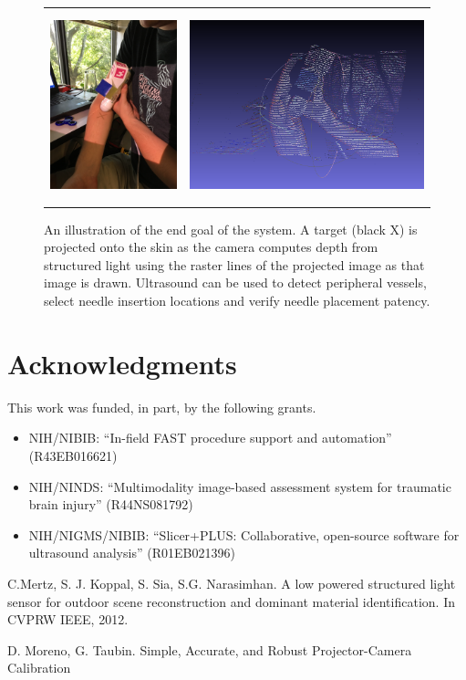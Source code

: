 \documentclass{llncs}
\begin{document}
\begin{figure}
\centering
\begin{tabular}{cc}
\centering
\includegraphics[height=5.5cm,keepaspectratio]{Hastings_arm} &
\includegraphics[height=5.5cm,keepaspectratio]{Hastings_arm_pointcloud}\\
\end{tabular}

\caption{An illustration of the end goal of the system. A target (black X) is projected onto the skin as the camera computes depth from structured light using the raster lines of the projected image as that image is drawn. Ultrasound can be used to detect peripheral vessels, select needle insertion locations and verify needle placement patency.
}

\end{figure}


\section*{Acknowledgments}
This work was funded, in part, by the following grants.

\begin{itemize}
	\item NIH/NIBIB: “In-field FAST procedure support and automation” (R43EB016621)
	\item NIH/NINDS: “Multimodality image-based assessment system for traumatic brain injury” (R44NS081792)
	\item NIH/NIGMS/NIBIB: “Slicer+PLUS: Collaborative, open-source software for ultrasound analysis” (R01EB021396)
\end{itemize}

%
%
\begin{thebibliography}{}
%
C.Mertz, S. J. Koppal, S. Sia, S.G. Narasimhan. A low powered structured light sensor for outdoor scene reconstruction and dominant material identification. In CVPRW IEEE, 2012.

D. Moreno, G. Taubin. Simple, Accurate, and Robust Projector-Camera Calibration

\end{thebibliography}
\end{document}
